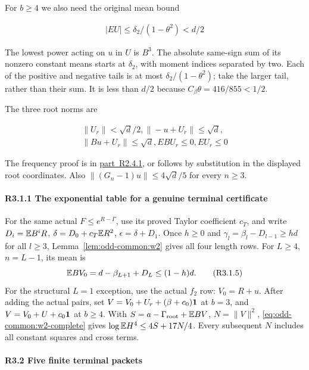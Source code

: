 For \(b\ge4\) we also need the original mean bound

\[
\begin{gathered}
|EU|\le \delta_2/(1-\theta^2)<d/2 
\end{gathered}\tag{R3.1.3}
\]

The lowest power acting on \(u\) in \(U\) is \(B^3\). The absolute same-sign sum of its nonzero constant means starts at \( \delta_2\), with moment indices separated by two. Each of the positive and negative tails is at most \( \delta_2/(1-\theta^2)\); take the larger tail, rather than their sum. It is less than \(d/2\) because \(C_\beta\theta=416/855<1/2\).

The three root norms are

\[
\begin{gathered}
\|U_r\|<\sqrt{d}/2,\|-u+U_r\|\le \sqrt{d},\\
\|Bu+U_r\|\le \sqrt{d},EBU_r\le 0,EU_r\le 0 
\end{gathered}\tag{R3.1.4}
\]

The frequency proof is in \mbox{\hyperref[part:R2.4.1]{part R2.4.1}}, or follows by substitution in the displayed root coordinates. Also \(\|(G_n-1)u\|\le4\sqrt d/5\) for every \(n\ge3\).

\paragraph{R3.1.1 The exponential table for a genuine terminal certificate}

For the same actual \(F\le e^{R-\Gamma}\), use its proved Taylor
coefficient \(c_T\), and write
\(D_i=\mathbb E B^iR\), \(\delta=D_0+c_T\mathbb E R^2\),
\(\epsilon=\delta+D_1\).
Once \(h\ge0\) and \(\gamma_l=\beta_l-D_{l-1}\ge hd\) for all \(l\ge3\),
Lemma~\ref{lem:odd-common:w2} gives all four length rows.
For \(L\ge4\), \(n=L-1\), its mean is
\[
 \mathbb E BV_0=d-\beta_{L+1}+D_L\le(1-h)d.\tag{R3.1.5}
\]
For the structural \(L=1\) exception, use the actual \(f_2\) row:
\(V_0=R+u\).
After adding the actual pairs, set
\(V=V_0+U_r+(\beta+c_0)\mathbf1\) at \(b=3\), and
\(V=V_0+U+c_0\mathbf1\) at \(b\ge4\).
With \(S=a-\Gamma_{\rm root}+\mathbb E BV\), \(N=\|V\|^2\),
\eqref{eq:odd-common:w2-complete} gives
\(\log\mathbb E H^4\le4S+17N/4\). Every subsequent \(N\) includes
all constant squares and cross terms.

\paragraph{R3.2 Five finite terminal packets}

